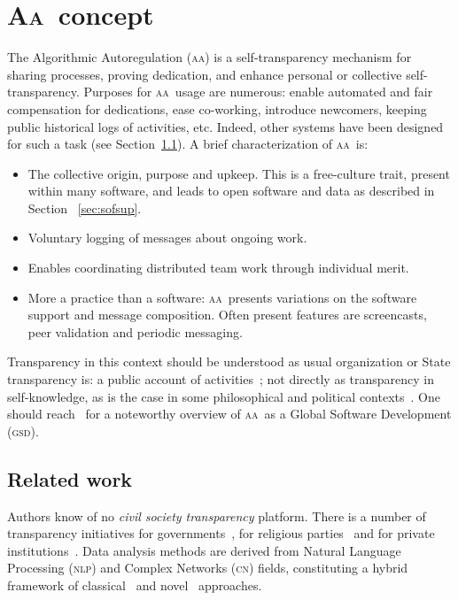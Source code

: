 \documentclass[a4paper, 11pt]{article} %
\newcommand{\nlp}{\textsc{nlp}}
\newcommand{\cn}{\textsc{cn}}
\newcommand{\aab}{\textsc{aa}}
\newcommand{\aai}{\textsc{Aa}}
\newcommand{\gsd}{\textsc{gsd}}
\begin{document}
\section{\aai\ concept}\label{sec:start}
The Algorithmic Autoregulation (\aab) is a self-transparency mechanism for sharing processes, proving dedication, and enhance personal or collective self-transparency. Purposes for \aab\ usage are numerous: enable automated and fair compensation for dedications, ease co-working, introduce newcomers, keeping public historical logs of activities, etc. Indeed, other systems have been designed for such a task (see Section~\ref{sec:rel}). A brief characterization of \aab\ is:
\begin{itemize}
    \item The collective origin, purpose and upkeep. This is a free-culture trait, present within many software, and leads to open software and data as described in Section ~\ref{sec:sofsup}.
    \item Voluntary logging of messages about ongoing work.
    \item Enables coordinating distributed team work through individual merit.
    \item More a practice than a software: \aab\ presents variations on the software support and message composition. Often present features are screencasts, peer validation and periodic messaging.
\end{itemize}

Transparency in this context should be understood as usual organization or State transparency is: a public account of activities~\cite{stso}; not directly as transparency in self-knowledge, as is the case in some philosophical and political contexts~\cite{stph}. One should reach~\cite{paaper} for a noteworthy overview of \aab\ as a Global Software Development (\gsd).

 \subsection{Related work}\label{sec:rel}
 Authors know of no \emph{civil society transparency} platform. There is a number of transparency initiatives for governments~\cite{govTr}, for religious parties~\cite{espTr} and for private institutions~\cite{priTr}. Data analysis methods are derived from Natural Language Processing (\nlp) and Complex Networks (\cn) fields, constituting a hybrid framework of classical~\cite{cla1,cla2} and novel~\cite{nov1,nov2} approaches.
\end{document}
